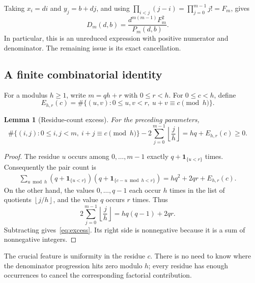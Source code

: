 \documentclass[11pt,a4paper]{article}
\newtheorem{lemma}[theorem]{Lemma}
\theoremstyle{definition}
\theoremstyle{remark}
\newcommand{\sfac}{F}
\newcommand{\floor}[1]{\left\lfloor #1\right\rfloor}
\begin{document}
Taking $x_i=di$ and $y_j=b+dj$, and using
$\prod_{i<j}(j-i)=\prod_{j=0}^{m-1}j!=\sfac_m$, gives
\begin{equation}
 D_m(d,b)=\frac{d^{m(m-1)}\sfac_m^2}{P_m(d,b)}.
 \label{eq:raw}
\end{equation}
In particular, this is an unreduced expression with positive numerator and
denominator. The remaining issue is its exact cancellation.

\subsection{A finite combinatorial identity}
For a modulus $h\ge1$, write $m=qh+r$ with $0\le r<h$. For
$0\le c<h$, define
\[
 E_{h,r}(c)=\#\{(u,v):0\le u,v<r,\ u+v\equiv c\pmod h\}.
\]

\begin{lemma}[Residue-count excess]
\label{lem:excess}
For the preceding parameters,
\begin{equation}
 \#\{(i,j):0\le i,j<m,\ i+j\equiv c\pmod h\}
 -2\sum_{j=0}^{m-1}\floor{\frac jh}
 =hq+E_{h,r}(c)\ge0.
 \label{eq:excess}
\end{equation}
\end{lemma}
\begin{proof}
The residue $u$ occurs among $0,\ldots,m-1$ exactly
$q+\mathbf1_{\{u<r\}}$ times. Consequently the pair count is
\begin{align*}
 \sum_{u\bmod h}
 (q+\mathbf1_{\{u<r\}})
 (q+\mathbf1_{\{c-u\bmod h<r\}})
 =hq^2+2qr+E_{h,r}(c).
\end{align*}
On the other hand, the values $0,\ldots,q-1$ each occur $h$ times in the
list of quotients $\floor{j/h}$, and the value $q$ occurs $r$ times. Thus
\[
 2\sum_{j=0}^{m-1}\floor{\frac jh}=hq(q-1)+2qr.
\]
Subtracting gives~\eqref{eq:excess}. Its right side is nonnegative because
it is a sum of nonnegative integers.
\end{proof}

The crucial feature is uniformity in the residue $c$. There is no need to
know where the denominator progression hits zero modulo $h$; every residue
has enough occurrences to cancel the corresponding factorial contribution.
\end{document}
